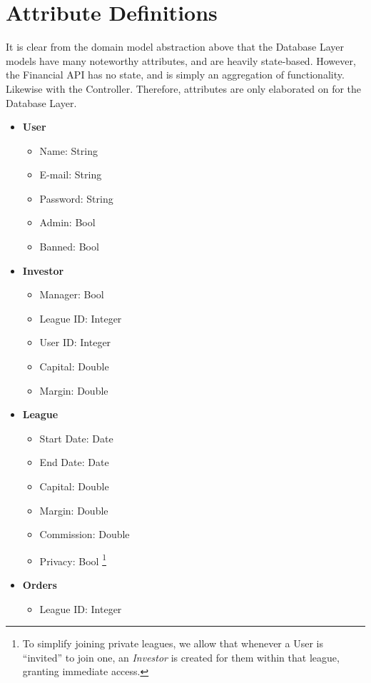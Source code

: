 \section{Attribute Definitions}

It is clear from the domain model abstraction above that the Database Layer
models have many noteworthy attributes, and are heavily state-based. However,
the Financial API has no state, and is simply an aggregation of functionality.
Likewise with the Controller. Therefore, attributes are only elaborated on for
the Database Layer. 

\begin{itemize}
	\item \textbf{User}
		\begin{itemize}
		\item Name: String
		\item E-mail: String
		\item Password: String
		\item Admin: Bool
		\item Banned: Bool
		\end{itemize}
	\item \textbf{Investor}
		\begin{itemize}
		\item Manager: Bool
		\item League ID: Integer
		\item User ID: Integer
		\item Capital: Double
		\item Margin: Double
		\end{itemize}
	\item \textbf{League}
		\begin{itemize}
		\item Start Date: Date
		\item End Date: Date
		\item Capital: Double
		\item Margin: Double
		\item Commission: Double
		\item Privacy: Bool \footnote{To simplify joining private leagues, 
			we allow that whenever a User is ``invited'' to join one,
			an \emph{Investor} is created for them within that league, 
			granting immediate access.}
		\end{itemize}
	\item \textbf{Orders}
		\begin{itemize}
		\item League ID: Integer

\end{itemize}
\end{itemize}
